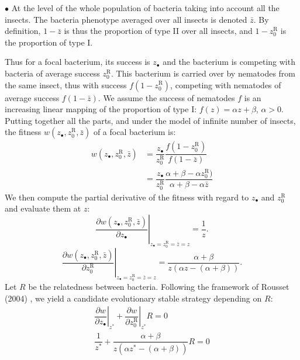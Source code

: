 \documentclass[10pt]{article}
\begin{document}
\begin{multicols}{2}
$\bullet$ At the level of the whole population of bacteria taking into account all the insects. The bacteria phenotype averaged over all insects is denoted $\bar{z}$. By definition, $1-\bar{z}$ is thus the proportion of type II over all insects, and $1-z_0^{\mathrm{R}}$ is the proportion of type I.

Thus for a focal bacterium, its success is $z_\bullet$ and the bacterium is competing with bacteria of average success $z_0^{\mathrm{R}}$. This bacterium is carried over by nematodes from the same insect, thus with success $f(1- z_0^{\mathrm{R}})$, competing with nematodes of average success $f(1- \bar{z} )$. We assume the success of nematodes $f$ is an increasing linear mapping of the proportion of type I: $f (z)=\alpha z+\beta$, $\alpha>0$.
  Putting together all the parts, and under the model of infinite number of insects, the fitness $w(z_\bullet ,z_0^{\mathrm{R}} , \bar{z} )$ of a focal bacterium is:
  \begin{align}
  w(z_\bullet ,z_0^{\mathrm{R}} , \bar{z} ) &= \dfrac{z_\bullet}{z_0^{\mathrm{R}}}\dfrac{f(1- z_0^{\mathrm{R}}) }{f(1- \bar{z} )} \\
  & = \dfrac{z_\bullet}{z_0^{\mathrm{R}}}\dfrac{\alpha+\beta-\alpha z_0^{\mathrm{R}}) }{\alpha+\beta-\alpha \bar{z}}
  \end{align}
  We then compute the partial derivative of the fitness with regard to $z_\bullet$ and $z_0^{\mathrm{R}}$ and evaluate them at $z$:
  \begin{equation}
   \left. \dfrac{\partial w(z_\bullet ,z_0^{\mathrm{R}} , \bar{z} )}{\partial z_\bullet} \right\vert_{z_\bullet = z_0^{\mathrm{R}} = \bar{z}=z} = \dfrac{1}{ z }.
  \end{equation}
  \begin{equation}
   \left. \dfrac{\partial w(z_\bullet ,z_0^{\mathrm{R}} , \bar{z} )}{\partial z_0^{\mathrm{R}}} \right\vert_{z_\bullet = z_0^{\mathrm{R}} = \bar{z}=z} = \dfrac{\alpha +\beta}{z(\alpha z -(\alpha+\beta))}.
  \end{equation}
  Let $R$ be the relatedness between bacteria. Following the framework of Rousset (2004) \cite{rousset2004genetic}, we yield a candidate evolutionary stable strategy depending on $R$:
    \begin{align}
    \left. \dfrac{\partial w}{\partial z_\bullet} \right\vert_{z^*} + \left. \dfrac{\partial w}{\partial z_0^{\mathrm{R}}} \right\vert_{z^*} R =0 \\
  \dfrac{1}{ z^* } + \dfrac{\alpha +\beta}{z(\alpha z^* -(\alpha+\beta))}R =0
  \end{align}

\end{multicols}
\end{document}
